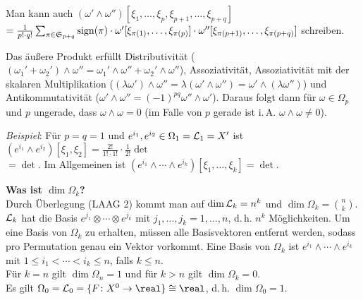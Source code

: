 Man kann auch $(\omega' \land \omega'')[\xi_1, \dotsc, \xi_p,
\xi_{p+1}, \dotsc, \xi_{p+q}]$ \\
$= \frac{1}{p! \cdot q!} \sum_{\pi \in \mathfrak{S}_{p+q}} \operatorname{sign}(\pi) \cdot
\omega'[\xi_{\pi(1)}, \dotsc, \xi_{\pi(p)}] \cdot
\omega''[\xi_{\pi(p+1)}, \dotsc, \xi_{\pi(p+q)}]$ schreiben.

Das äußere Produkt erfüllt Distributivität
($(\omega_1' + \omega_2') \land \omega'' =
\omega_1' \land \omega'' + \omega_2' \land \omega''$), Assoziativität,
Assoziativität mit der skalaren Multiplikation
($(\lambda \omega') \land \omega'' = \lambda (\omega' \land \omega'') =
\omega' \land (\lambda \omega'')$) und \\
Antikommutativität
($\omega' \land \omega'' = (-1)^{pq} \omega'' \land \omega'$).
Daraus folgt dann für $\omega \in \Omega_{p}$ und $p$ ungerade, dass
$\omega \land \omega = 0$
(im Falle von $p$ gerade ist i.\,A. $\omega \land \omega \not= 0$).

\emph{Beispiel}:
Für $p = q = 1$ und $e^{i_1}, e^{i_2} \in \Omega_1 = \mathcal{L}_1 = X'$ ist
$(e^{i_1} \land e^{i_2})[\xi_1, \xi_2] =
\frac{2!}{1! \cdot 1!} \cdot \frac{1}{2!}
\det$ \\
$= \det$.
Im Allgemeinen ist
$(e^{i_1} \land \dotsb \land e^{i_k})[\xi_1, \dotsc, \xi_k] =
\det$.

\vspace{3mm}
\linie

\textbf{Was ist $\dim \Omega_k$?} \\
Durch Überlegung (LAAG 2) kommt man auf $\dim \mathcal{L}_k = n^k$ und
$\dim \Omega_k = \binom{n}{k}$. \\
$\mathcal{L}_k$ hat die Basis $e^{j_1} \otimes \dotsb \otimes e^{j_k}$ mit
$j_1, \dotsc, j_k = 1, \dotsc, n$, d.\,h. $n^k$ Möglichkeiten.
Um eine Basis von $\Omega_k$ zu erhalten, müssen alle Basisvektoren entfernt
werden, sodass pro Permutation genau ein Vektor vorkommt.
Eine Basis von $\Omega_k$ ist $e^{i_1} \land \dotsb \land e^{i_k}$ mit
$1 \le i_1 < \dotsb < i_k \le n$, falls $k \le n$. \\
Für $k = n$ gilt $\dim \Omega_n = 1$ und für $k > n$ gilt
$\dim \Omega_k = 0$. \\
Es gilt $\Omega_0 = \L_0 = \{F\colon X^0 \rightarrow \real\} \cong \real$,
d.\,h. $\dim \Omega_0 = 1$.

